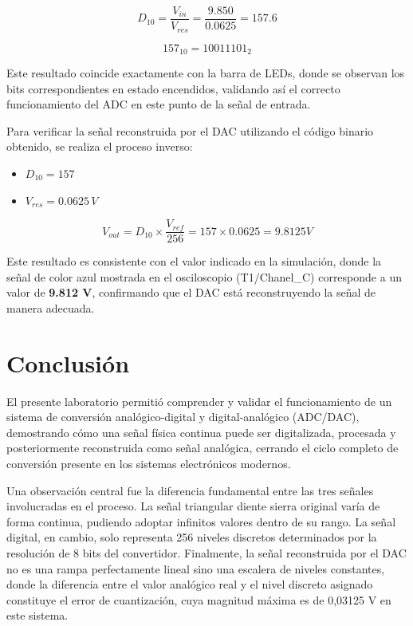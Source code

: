 \documentclass[12pt,letterpaper]{article}
\begin{document}
    $$D_{10} = \frac{V_{in}}{V_{res}} = \frac{9.850}{0.0625} = 157.6$$

    $$157_{10} = 1001 1101_2$$

    Este resultado coincide exactamente con la barra de LEDs, donde se observan los bits correspondientes en estado encendidos, validando así el correcto funcionamiento del ADC en este punto de la señal de entrada.

    Para verificar la señal reconstruida por el DAC utilizando el código binario obtenido, se realiza el proceso inverso:
    
    \begin{itemize}
        \item $D_{10} = 157$
        \item $V_{res} = 0.0625 \, V$
    \end{itemize}

    $$V_{out} = D_{10} \times \frac{V_{ref}}{256} = 157 \times 0.0625 = 9.8125 V$$

    Este resultado es consistente con el valor indicado en la simulación, donde la señal de color azul mostrada en el osciloscopio (T1/Chanel\_C) corresponde a un valor de \textbf{9.812 V}, confirmando que el DAC está reconstruyendo la señal de manera adecuada.

    \newpage

    \section{Conclusión}

    El presente laboratorio permitió comprender y validar el funcionamiento de un sistema 
    de conversión analógico-digital y digital-analógico (ADC/DAC), demostrando cómo una 
    señal física continua puede ser digitalizada, procesada y posteriormente reconstruida 
    como señal analógica, cerrando el ciclo completo de conversión presente en los sistemas 
    electrónicos modernos.

    Una observación central fue la diferencia fundamental entre las tres señales involucradas 
    en el proceso. La señal triangular diente sierra original varía de forma continua, pudiendo 
    adoptar infinitos valores dentro de su rango. La señal digital, en cambio, solo representa 
    256 niveles discretos determinados por la resolución de 8 bits del convertidor. Finalmente, 
    la señal reconstruida por el DAC no es una rampa perfectamente lineal sino una escalera 
    de niveles constantes, donde la diferencia entre el valor analógico real y el nivel discreto 
    asignado constituye el error de cuantización, cuya magnitud máxima es de 0,03125 V 
    en este sistema.
\end{document}
